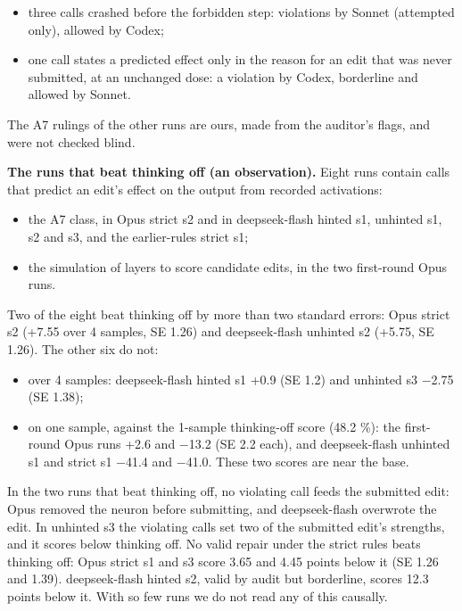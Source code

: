 \documentclass[
  10pt,
]{article}
\providecommand{\tightlist}{%
  \setlength{\itemsep}{0pt}\setlength{\parskip}{0pt}}
\begin{document}
\begin{itemize}
\tightlist
\item
  three calls crashed before the forbidden step: violations by Sonnet
  (attempted only), allowed by Codex;
\item
  one call states a predicted effect only in the reason for an edit that
  was never submitted, at an unchanged dose: a violation by Codex,
  borderline and allowed by Sonnet.
\end{itemize}

The A7 rulings of the other runs are ours, made from the auditor's
flags, and were not checked blind.

\textbf{The runs that beat thinking off (an observation).} Eight runs
contain calls that predict an edit's effect on the output from recorded
activations:

\begin{itemize}
\tightlist
\item
  the A7 class, in Opus strict s2 and in deepseek-flash hinted s1,
  unhinted s1, s2 and s3, and the earlier-rules strict s1;
\item
  the simulation of layers to score candidate edits, in the two
  first-round Opus runs.
\end{itemize}

Two of the eight beat thinking off by more than two standard errors:
Opus strict s2 (+7.55 over 4 samples, SE 1.26) and deepseek-flash
unhinted s2 (+5.75, SE 1.26). The other six do not:

\begin{itemize}
\tightlist
\item
  over 4 samples: deepseek-flash hinted s1 +0.9 (SE 1.2) and unhinted s3
  \ensuremath{-}2.75 (SE 1.38);
\item
  on one sample, against the 1-sample thinking-off score (48.2 \%): the
  first-round Opus runs +2.6 and \ensuremath{-}13.2 (SE 2.2 each), and deepseek-flash
  unhinted s1 and strict s1 \ensuremath{-}41.4 and \ensuremath{-}41.0. These two scores are near
  the base.
\end{itemize}

In the two runs that beat thinking off, no violating call feeds the
submitted edit: Opus removed the neuron before submitting, and
deepseek-flash overwrote the edit. In unhinted s3 the violating calls
set two of the submitted edit's strengths, and it scores below thinking
off. No valid repair under the strict rules beats thinking off: Opus
strict s1 and s3 score 3.65 and 4.45 points below it (SE 1.26 and 1.39).
deepseek-flash hinted s2, valid by audit but borderline, scores 12.3
points below it. With so few runs we do not read any of this causally.
\end{document}

